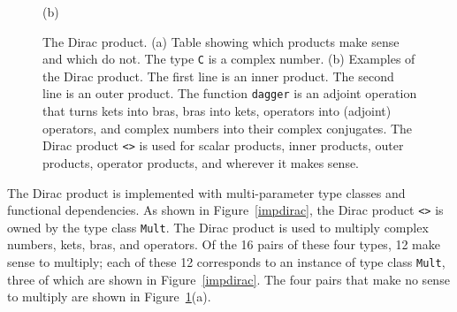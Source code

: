 \documentclass[12pt]{article}
\newcommand{\DataTypeTok}[1]{\textcolor[rgb]{0.56,0.13,0.00}{{#1}}}
\newcommand{\FunctionTok}[1]{\textcolor[rgb]{0.02,0.16,0.49}{{#1}}}
\newcommand{\OperatorTok}[1]{\textcolor[rgb]{0.40,0.40,0.40}{{#1}}}
\begin{document}
\begin{figure}
\begin{center}
(b)
\end{center}
\caption{The Dirac product.  (a)  Table showing which products make sense and which do not.
  The type \DataTypeTok{\texttt{C}} is a complex number.
  (b)  Examples of the Dirac product.
  The first line is an inner product.
  The second line is an outer product.
  The function \FunctionTok{\texttt{dagger}} is an adjoint operation
  that turns kets into bras, bras into kets, operators into
  (adjoint) operators, and complex numbers into their complex conjugates.
  The Dirac product \OperatorTok{\texttt{<>}} is used for scalar
  products, inner products, outer products, operator products, and wherever
  it makes sense.
}
\label{products}
\end{figure}

The Dirac product is implemented with multi-parameter type classes
and functional dependencies.  As shown in Figure~\ref{impdirac},
the Dirac product \OperatorTok{\texttt{<>}} is owned by the type class
\DataTypeTok{\texttt{Mult}}.  The Dirac product is used to multiply
complex numbers, kets, bras, and operators.  Of the 16 pairs of
these four types, 12 make sense to multiply; each of these 12 corresponds
to an instance of type class \DataTypeTok{\texttt{Mult}}, three of
which are shown in Figure~\ref{impdirac}.  The four pairs that
make no sense to multiply are shown in Figure~\ref{products}(a).
\end{document}
